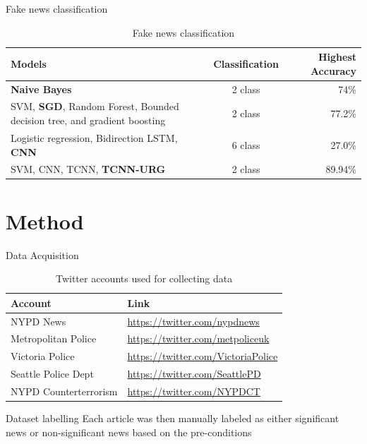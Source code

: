 \documentclass[12pt]{beamer}
\begin{document}
\begin{frame}{Fake news classification}
    \begin{table}[ht]
    \centering
    \begin{tabular}{ p{4cm} c r }
    \hline
    \textbf{Models} & \textbf{Classification} & \textbf{Highest Accuracy} \\
    \hline
    \textbf{Naive Bayes} & 2 class & 74\% \\
    \hline
    SVM, \textbf{SGD}, Random Forest, Bounded decision tree, and gradient boosting & 2 class & 77.2\% \\
    \hline
    Logistic regression, Bidirection LSTM, \textbf{CNN} & 6 class & 27.0\% \\
    \hline
    SVM, CNN, TCNN, \textbf{TCNN-URG} & 2 class & 89.94\% \\
    \hline
    \end{tabular}
    \caption{Fake news classification}
    \label{tbl:fake_news_classification_performance}
    \end{table}

\end{frame}

\section{Method}

\begin{frame}{Data Acquisition}
\begin{table}
    \centering
    \label{tbl:twitter_users}
    \begin{tabular}{p{3.5cm} l}
    \toprule
    Account & Link \\
    \midrule
    NYPD News & \url{https://twitter.com/nypdnews} \\
    Metropolitan Police & \url{https://twitter.com/metpoliceuk} \\
    Victoria Police & \url{https://twitter.com/VictoriaPolice} \\
    Seattle Police Dept & \url{https://twitter.com/SeattlePD} \\
    NYPD Counterterrorism & \url{https://twitter.com/NYPDCT} \\
    \bottomrule
    \end{tabular}
    \caption{Twitter accounts used for collecting data}
\end{table}
\end{frame}

\begin{frame}{Dataset labelling}
    Each article was then manually labeled as either significant news or non-significant news based on the pre-conditions
\end{frame}
\end{document}
